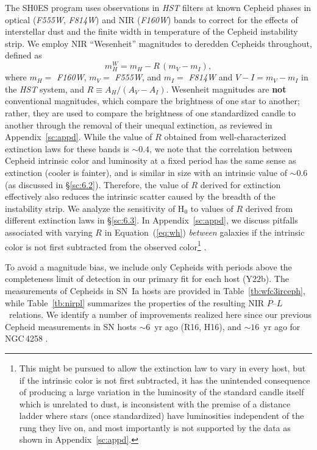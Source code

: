 \documentclass[12pt]{aastex631}
\newcommand{\bq}{\begin{equation}}
\newcommand{\eq}{\end{equation}}
\newcommand{\PLs}{$P$--$L$\ }
\begin{document}
The SH0ES program uses observations in  {\it HST}  filters at known Cepheid phases in optical ({\it F555W}, {\it F814W}) and NIR ({\it F160W}) bands to correct for the effects of interstellar dust and the finite width in temperature of the Cepheid instability strip. We employ NIR ``Wesenheit'' magnitudes \citep{madore82} to deredden Cepheids throughout, defined as
\bq m_H^W = m_{H} - R \, (m_{V}\!-\!m_{I}), \label{eq:wh} \eq 
\noindent where $m_H=$ {\it F160W}, $m_V=$ {\it F555W}, and $m_I=$ {\it F814W} and $V-I=m_V-m_I$ in the  {\it HST} system, and $R\equiv A_H/(A_V\!-\!A_I)$.   Wesenheit magnitudes are {\bf not} conventional magnitudes, which compare the brightness of one star to another; rather, they are used to compare the brightness of one standardized candle to another through the removal of  their unequal extinction, as reviewed in Appendix~\ref{sc:appd}. While the value of $R$ obtained from well-characterized extinction laws for these bands is $\sim 0.4$, we note that the correlation between Cepheid intrinsic color and luminosity at a fixed period has the same sense as extinction (cooler is fainter), and is similar in size with an intrinsic value of $\sim 0.6$ (as discussed in \S\ref{sc:6.2}).  Therefore, the value of $R$ derived for extinction effectively also reduces the intrinsic scatter caused by the breadth of the instability strip.  We analyze the sensitivity of H$_0$ to values of $R$ derived from different extinction laws in \S\ref{sc:6.3}. In Appendix~\ref{sc:appd}, we discuss pitfalls associated with varying $R$ in Equation~(\ref{eq:wh}) {\it between} galaxies if the intrinsic color is not first subtracted from the observed color\footnote{This might be pursued to allow  the extinction law to vary in every host, but if the intrinsic color is not first subtracted, it has the unintended consequence of producing a large variation in the luminosity of the standard candle itself which is unrelated to dust, is inconsistent with the premise of a distance ladder where stars (once standardized) have luminosities independent of the rung they live on, and most importantly is not supported by the data as shown in Appendix~\ref{sc:appd}.} \citep{Follin:2017, Mortsell:2021}. 

To avoid a magnitude bias, we include only Cepheids with periods above the completeness limit of detection in our primary fit for each host (Y22b).  The measurements of Cepheids in SN~Ia hosts are provided in Table~\ref{tb:wfc3irceph}, while Table~\ref{tb:nirpl} summarizes the properties of the resulting NIR \PLs relations. We identify a number of improvements realized here since our previous Cepheid measurements in SN hosts $\sim 6$~yr ago (R16, H16), and $\sim 16$~yr ago for NGC$\,$4258 \citep{macri06}.
\end{document}
